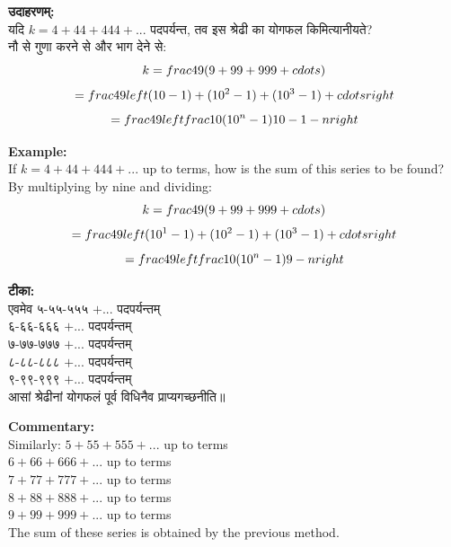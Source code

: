 \documentclass[10pt,a4paper]{article}
\newcommand{\bilingual}[2]{%
  \noindent%
  \begin{minipage}[t]{0.47\textwidth}%
    \setstretch{1.15}#1%
  \end{minipage}%
  \hfill%
  \vrule\hfill%
  \begin{minipage}[t]{0.47\textwidth}%
    \setstretch{1.15}#2%
  \end{minipage}%
  \par\medskip
}
\begin{document}
\bilingual{%
\textbf{उदाहरणम्:}\\[0.3em]
यदि $k = 4 + 44 + 444 + ...$ पदपर्यन्त, तव इस श्रेढी का योगफल किमित्यानीयते?\\[0.3em]
नौ से गुणा करने से और भाग देने से:
\[
k = \\frac{4}{9}(9 + 99 + 999 + \\cdots)
\]
\[
= \\frac{4}{9}\\left\\{(10-1) + (10^2-1) + (10^3-1) + \\cdots\\right\\}
\]
\[
= \\frac{4}{9}\\left\\{\\frac{10(10^n - 1)}{10 - 1} - n\\right\\}
\]
}{%
\textbf{Example:}\\[0.3em]
If $k = 4 + 44 + 444 + ...$ up to terms, how is the sum of this series to be found?\\[0.3em]
By multiplying by nine and dividing:
\[
k = \\frac{4}{9}(9 + 99 + 999 + \\cdots)
\]
\[
= \\frac{4}{9}\\left\\{(10^1-1) + (10^2-1) + (10^3-1) + \\cdots\\right\\}
\]
\[
= \\frac{4}{9}\\left\\{\\frac{10(10^n - 1)}{9} - n\\right\\}
\]
}

\bilingual{%
\textbf{टीका:}\\[0.3em]
एवमेव ५-५५-५५५ $+ ...$ पदपर्यन्तम्\\
६-६६-६६६ $+ ...$ पदपर्यन्तम्\\
७-७७-७७७ $+ ...$ पदपर्यन्तम्\\
८-८८-८८८ $+ ...$ पदपर्यन्तम्\\
९-९९-९९९ $+ ...$ पदपर्यन्तम्\\[0.3em]
आसां श्रेढीनां योगफलं पूर्व विधिनैव प्राप्यगच्छनीति॥
}{%
\textbf{Commentary:}\\[0.3em]
Similarly: $5 + 55 + 555 + ...$ up to terms\\
$6 + 66 + 666 + ...$ up to terms\\
$7 + 77 + 777 + ...$ up to terms\\
$8 + 88 + 888 + ...$ up to terms\\
$9 + 99 + 999 + ...$ up to terms\\[0.3em]
The sum of these series is obtained by the previous method.
}
\end{document}
